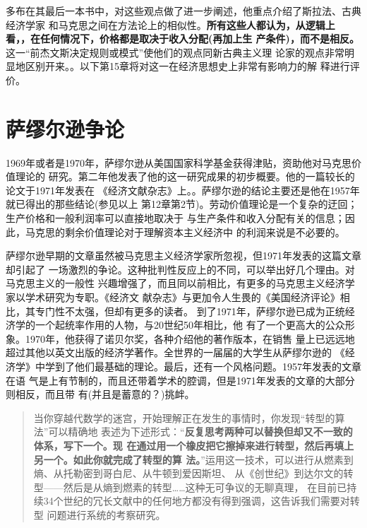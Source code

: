 多布在其最后一本书中，对这些观点做了进一步阐述，他重点介绍了斯拉法、古典经济学家
和马克思之间在方法论上的相似性。\textbf{所有这些人都认为，从逻辑上
  看，，在任何情况下，价格都是取决于收入分配(再加上生
  产条件)，而不是相反。}这一“前杰文斯决定规则或模式”使他们的观点同新古典主义理
论家的观点非常明显地区别开来。。以下第15章将对这一在经济思想史上非常有影响力的解
释进行评价。

\section{萨缪尔逊争论}

1969年或者是1970年，萨缪尔逊从美国国家科学基金获得津贴，资助他对马克思价值理论的
研究。第二年他发表了他的这一研究成果的初步概要。他的一篇较长的论文于1971年发表在
《经济文献杂志》上。。萨缪尔逊的结论主要还是他在1957年就已得出的那些结论(参见以上
第12章第2节)。劳动价值理论是一个复杂的迂回；生产价格和一般利润率可以直接地取决于
与生产条件和收入分配有关的信息；因此，马克思的剩余价值理论对于理解资本主义经济中
的利润来说是不必要的。

萨缪尔逊早期的文章虽然被马克思主义经济学家所忽视，但1971年发表的这篇文章却引起了
一场激烈的争论。这种批判性反应上的不同，可以举出好几个理由。对马克思主义的一般性
兴趣增强了，而且同以前相比，有更多的马克思主义经济学家以学术研究为专职。《经济文
献杂志》与更加令人生畏的《美国经济评论》相比，其专门性不太强，但却有更多的读者。
到了1971年，萨缪尔逊已成为正统经济学的一个起统率作用的人物，与20世纪50年相比，他
有了一个更高大的公众形象。1970年，他获得了诺贝尔奖，各种介绍他的著作版本，在销售
量上已远远地超过其他以英文出版的经济学著作。全世界的一届届的大学生从萨缪尔逊的
《经济学》中学到了他们最基础的理论。最后，还有一个风格问题。1957年发表的文章在语
气是上有节制的，而且还带着学术的腔调，但是1971年发表的文章的大部分则相反，而且带
有(并且是蓄意的？)挑衅。
\begin{quotation}
  当你穿越代数学的迷宫，开始理解正在发生的事情时，你发现“转型的算法”可以精确地
  表述为下述形式：“\textbf{反复思考两种可以替换但却又不一致的体系，写下一个。现
    在通过用一个橡皮把它擦掉来进行转型，然后再填上另一个。如此你就完成了转型的算
    法。}”运用这一技术，可以进行从燃素到熵、从托勒密到哥白尼、从牛顿到爱因斯坦、
  从《创世纪》到达尔文的转型——然后是从熵到燃素的转型……这种无可争议的无聊真理，
  在目前已持续34个世纪的冗长文献中的任何地方都没有得到强调，这告诉我们需要对转型
  问题进行系统的考察研究。
\end{quotation}

